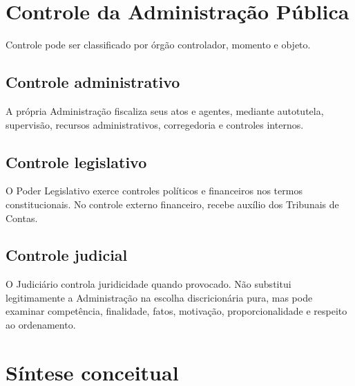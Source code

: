\section{Controle da Administração Pública}

Controle pode ser classificado por órgão controlador, momento e objeto.

\subsection{Controle administrativo}

A própria Administração fiscaliza seus atos e agentes, mediante autotutela, supervisão, recursos administrativos, corregedoria e controles internos.

\subsection{Controle legislativo}

O Poder Legislativo exerce controles políticos e financeiros nos termos constitucionais. No controle externo financeiro, recebe auxílio dos Tribunais de Contas.

\subsection{Controle judicial}

O Judiciário controla juridicidade quando provocado. Não substitui legitimamente a Administração na escolha discricionária pura, mas pode examinar competência, finalidade, fatos, motivação, proporcionalidade e respeito ao ordenamento.

\section{Síntese conceitual}


